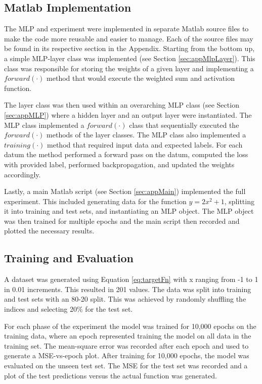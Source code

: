 \documentclass[11pt,pdftex,portrait,letterpaper]{article}
\begin{document}
\subsection{Matlab Implementation}

The MLP and experiment were implemented in separate Matlab source files to make the code more reusable and easier to manage. Each of the source files may be found in its respective section in the Appendix. Starting from the bottom up, a simple MLP-layer class was implemented (see Section \ref{sec:appMlpLayer}). This class was responsible for storing the weights of a given layer and implementing a $forward(\cdot)$ method that would execute the weighted sum and activation function.

The layer class was then used within an overarching MLP class (see Section \ref{sec:appMLP}) where a hidden layer and an output layer were instantiated. The MLP class implemented a $forward(\cdot)$ class that sequentially executed the $forward(\cdot)$ methods of the layer classes. The MLP class also implemented a $training(\cdot)$ method that required input data and expected labels. For each datum the method performed a forward pass on the datum, computed the loss with provided label, performed backpropagation, and updated the weights accordingly. 

Lastly, a main Matlab script (see Section \ref{sec:appMain}) implemented the full experiment. This included generating data for the function $y=2x^2+1$, splitting it into training and test sets, and instantiating an MLP object. The MLP object was then trained for multiple epochs and the main script then recorded and plotted the necessary results.
 
\subsection{Training and Evaluation} \label{sec:trainEval}

A dataset was generated using Equation \ref{eq:targetFn} with x ranging from -1 to 1 in 0.01 increments. This resulted in 201 values. The data was split into training and test sets with an 80-20 split. This was achieved by randomly shuffling the indices and selecting 20\% for the test set.

For each phase of the experiment the model was trained for 10,000 epochs on the training data, where an epoch represented training the model on all data in the training set. The mean-square error was recorded after each epoch and used to generate a MSE-vs-epoch plot. After training for 10,000 epochs, the model was evaluated on the unseen test set. The MSE for the test set was recorded and a plot of the test predictions versus the actual function was generated.
\end{document}
